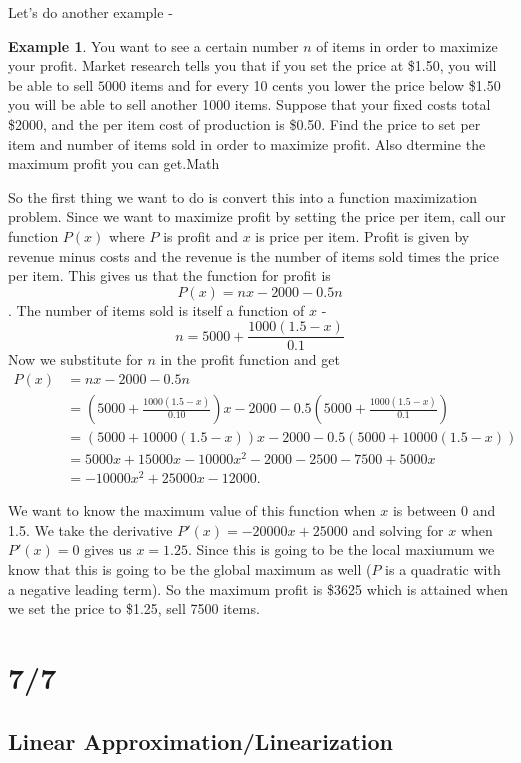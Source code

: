 \documentclass[12pt,reqno]{article}
\theoremstyle{definition}
\newtheorem*{Example}{Example}
\begin{document}
	Let's do another example - 
	\begin{Example}
		You want to see a certain number $n$ of items in order to maximize your profit. Market research tells you that if you set the price at \$1.50, you will be able to sell $5000$ items and for every 10 cents you lower the price below \$1.50 you will be able to sell another 1000 items. Suppose that your fixed costs total \$2000, and the per item cost of production is \$0.50. Find the price to set per item and number of items sold in order to maximize profit. Also dtermine the maximum profit you can get.Math 
		
		So the first thing we want to do is convert this into a function maximization problem. Since we want to maximize profit by setting the price per item, call our function $P(x)$ where $P$ is profit and $x$ is price per item. Profit is given by revenue minus costs and the revenue is the number of items sold times the price per item. This gives us that the function for profit is $$P(x) = nx - 2000 - 0.5n$$. The number of items sold is itself a function of $x$ - $$n = 5000 +\frac{1000 (1.5 - x)}{0.1}$$ Now we substitute for $n$ in the profit function and get 
		\begin{align*}
			P(x) &= nx - 2000 -0.5n \\
				 &= \left(5000 + \frac{1000(1.5 - x)}{0.10}\right)x - 2000 - 0.5\left(5000 + \frac{1000(1.5 - x)}{0.1}\right) \\
				 &= (5000 + 10000(1.5 - x))x - 2000 - 0.5(5000 + 10000(1.5 - x)) \\
				 &= 5000x + 15000x - 10000x^2 - 2000 - 2500 - 7500 + 5000x \\
				 &= -10000x^2 + 25000x - 12000.
		\end{align*}
		
		We want to know the maximum value of this function when $x$ is between 0 and 1.5. We take the derivative $P'(x) = -20000x + 25000$ and solving for $x$ when $P'(x) = 0$ gives us $x = 1.25$. Since this is going to be the local maxiumum we know that this is going to be the global maximum as well ($P$ is a quadratic with a negative leading term). So the maximum profit is \$3625 which is attained when we set the price to \$1.25, sell 7500 items. 
	\end{Example}
	
\section{7/7}

\subsection{Linear Approximation/Linearization}
\end{document}
